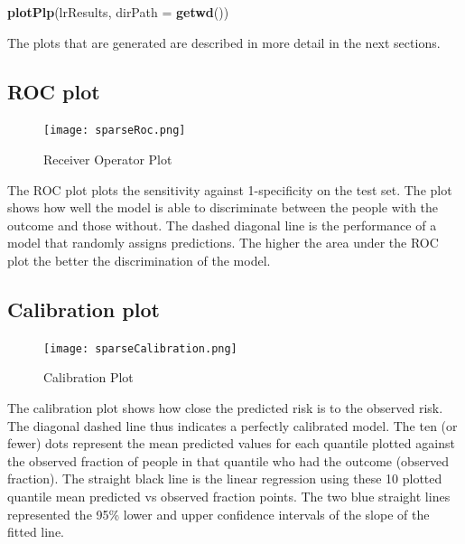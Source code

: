 \documentclass[]{article}
\newenvironment{Shaded}{\begin{snugshade}}{\end{snugshade}}
\newcommand{\KeywordTok}[1]{\textcolor[rgb]{0.13,0.29,0.53}{\textbf{#1}}}
\newcommand{\DataTypeTok}[1]{\textcolor[rgb]{0.13,0.29,0.53}{#1}}
\newcommand{\NormalTok}[1]{#1}
\begin{document}
\begin{Shaded}
\begin{Highlighting}[]
\KeywordTok{plotPlp}\NormalTok{(lrResults, }\DataTypeTok{dirPath =} \KeywordTok{getwd}\NormalTok{())}
\end{Highlighting}
\end{Shaded}

The plots that are generated are described in more detail in the next
sections.

\newpage

\subsection{ROC plot}\label{roc-plot}

\begin{figure}
\centering
\texttt{[image: sparseRoc.png]}
\caption{Receiver Operator Plot}
\end{figure}

The ROC plot plots the sensitivity against 1-specificity on the test
set. The plot shows how well the model is able to discriminate between
the people with the outcome and those without. The dashed diagonal line
is the performance of a model that randomly assigns predictions. The
higher the area under the ROC plot the better the discrimination of the
model.

\newpage

\subsection{Calibration plot}\label{calibration-plot}

\begin{figure}
\centering
\texttt{[image: sparseCalibration.png]}
\caption{Calibration Plot}
\end{figure}

The calibration plot shows how close the predicted risk is to the
observed risk. The diagonal dashed line thus indicates a perfectly
calibrated model. The ten (or fewer) dots represent the mean predicted
values for each quantile plotted against the observed fraction of people
in that quantile who had the outcome (observed fraction). The straight
black line is the linear regression using these 10 plotted quantile mean
predicted vs observed fraction points. The two blue straight lines
represented the 95\% lower and upper confidence intervals of the slope
of the fitted line.

\newpage
\end{document}
